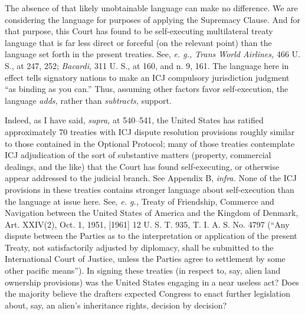 {  The absence of that likely unobtainable language can make no
difference. We are considering the language for purposes of applying
the Supremacy Clause. And for that purpose, this Court has found to be
self-executing multilateral treaty language that is far less direct or
forceful (on the relevant point) than the language set forth in the
present treaties. See, \emph{e. g., Trans World Airlines,} 466 U. S., at
247, 252; \emph{Bacardi,} 311 U. S., at 160, and n. 9, 161. The language
here in effect tells signatory nations to make an ICJ compulsory
jurisdiction judgment ``as binding as you can.'' Thus, assuming
other factors favor self-execution, the language \emph{adds,} rather than
\emph{subtracts,} support.

  Indeed, as I have said, \emph{supra,} at 540--541, the United States
has ratified approximately 70 treaties with ICJ dispute resolution
provisions roughly similar to those contained in the Optional Protocol;
many of those treaties contemplate ICJ adjudication of the sort of
substantive matters (property, commercial dealings, and the like) that
the Court has found self-executing, or otherwise appear addressed to
the judicial branch. See Appendix B, \emph{infra.} None of the ICJ
provisions in these treaties contains stronger language about \newpage 
self-execution than the language at issue here. See, \emph{e. g.,}
Treaty of Friendship, Commerce and Navigation between the United States
of America and the Kingdom of Denmark, Art. XXIV(2), Oct. 1, 1951,
[1961] 12 U. S. T. 935, T. I. A. S. No. 4797 (``Any dispute between
the Parties as to the interpretation or application of the present
Treaty, not satisfactorily adjusted by diplomacy, shall be submitted
to the International Court of Justice, unless the Parties agree to
settlement by some other pacific means''). In signing these treaties
(in respect to, say, alien land ownership provisions) was the United
States engaging in a near useless act? Does the majority believe the
drafters expected Congress to enact further legislation about, say, an
alien's inheritance rights, decision by decision?

}
